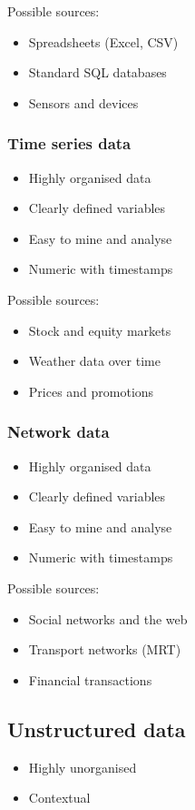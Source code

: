 \documentclass[11pt]{article}
\begin{document}
Possible sources:
\begin{itemize}
\item Spreadsheets (Excel, CSV)
\item Standard SQL databases
\item Sensors and devices
\end{itemize}
\subsubsection{Time series data}
\label{sec:org3f39f15}
\begin{itemize}
\item Highly organised data
\item Clearly defined variables
\item Easy to mine and analyse
\item Numeric with timestamps
\end{itemize}

Possible sources:
\begin{itemize}
\item Stock and equity markets
\item Weather data over time
\item Prices and promotions
\end{itemize}

 \newpage
\subsubsection{Network data}
\label{sec:org40fa7df}
\begin{itemize}
\item Highly organised data
\item Clearly defined variables
\item Easy to mine and analyse
\item Numeric with timestamps
\end{itemize}

Possible sources:
\begin{itemize}
\item Social networks and the web
\item Transport networks (MRT)
\item Financial transactions
\end{itemize}
\subsection{Unstructured data}
\label{sec:orgac0c685}
\begin{itemize}
\item Highly unorganised
\item Contextual
\end{itemize}
\end{document}
